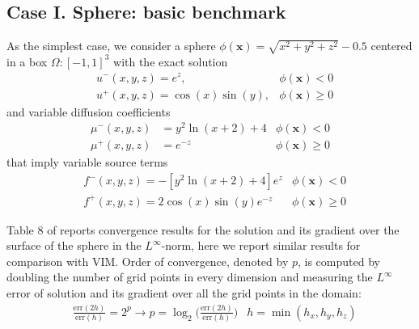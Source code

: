 \documentclass{elsarticle}
\begin{document}
\subsection{Case I. Sphere: basic benchmark}
As the simplest case, we consider a sphere $\phi(\mathbf{x})=\sqrt{x^2 + y^2 + z^2} - 0.5$ centered in a box $\Omega:[-1,1]^3$ with the exact solution
\begin{align*}
& u^-(x,y,z)=e^{z}, & \phi(\mathbf{x})<0\\
& u^+(x,y,z)=\cos(x)\sin(y), & \phi(\mathbf{x})\ge 0
\end{align*}
and variable diffusion coefficients
\begin{align*}
\mu^-(x,y,z)&=y^2 \ln(x+2) + 4 &\phi(\mathbf{x})<0 \\
\mu^+(x,y,z)&=e^{-z} &\phi(\mathbf{x})\ge 0 
\end{align*}
that imply variable source terms
\begin{align*}
&f^-(x,y,z)=-[y^2\ln(x+2) + 4] e^{z} &\phi(\mathbf{x})< 0\\
&f^+(x,y,z)=2\cos(x)\sin(y)e^{-z} &\phi(\mathbf{x})\ge 0
\end{align*}

Table 8 of \cite{guittet2015solving} reports convergence results for the solution and its gradient over the surface of the sphere in the $L^\infty$-norm, here we report similar results for comparison with VIM. Order of convergence, denoted by $p$, is computed by doubling the number of grid points in every dimension and measuring the $L^\infty$ error of solution and its gradient over all the grid points in the domain:
\begin{align*}
&\frac{\textrm{err}(2h)}{\textrm{err}(h)}=2^p \rightarrow p = \log_2\bigg(\frac{\textrm{err}(2h)}{\textrm{err}(h)}\bigg)  & h=\min(h_x,h_y,h_z)
\end{align*}
\end{document}
